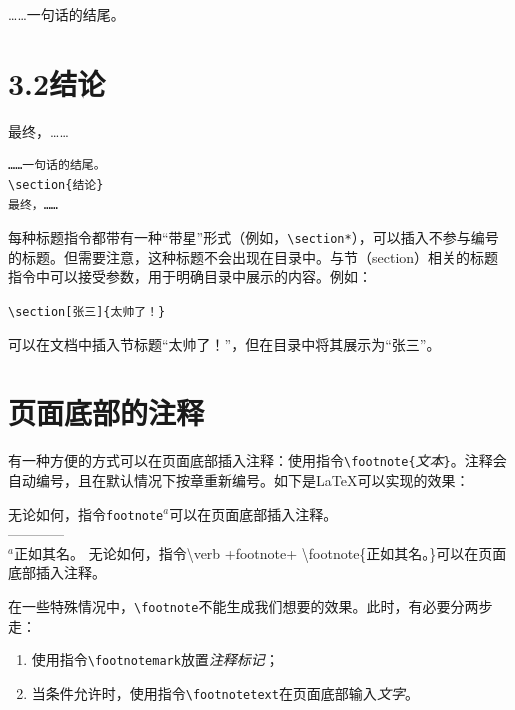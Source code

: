 \begin{codelist}[2.17]{
  ……一句话的结尾。
  \section*{3.2\quad 结论}
  最终，……
}\begin{verbatim}
……一句话的结尾。
\section{结论}
最终，……
\end{verbatim}
\end{codelist}

每种标题指令都带有一种“带星”形式（例如，\verb|\section*|），可以插入不参与编号的标题。但需要注意，这种标题不会出现在目录中。与节（section）相关的标题指令中可以接受参数，用于明确目录中展示的内容。例如：

\begin{dmd}
\verb+\section[张三]{太帅了！}+
\end{dmd}

可以在文档中插入节标题“太帅了！”，但在目录中将其展示为“张三”。

\section{页面底部的注释}

有一种方便的方式可以在页面底部插入注释：使用指令\verb|\footnote{|\textsl{\<文本\>}\verb|}|。注释会自动编号，且在默认情况下按章重新编号。如下是\LaTeX 可以实现的效果：

\begin{codelist}[2.18]{
  无论如何，指令\texttt{footnote}$^a$可以在页面底部插入注释。\\
  ————\\%
  {\footnotesize $^a$正如其名。}
}\ttfamily
无论如何，指令\backslash verb +footnote+
\backslash footnote\{正如其名。\}可以在页面
底部插入注释。\rmfamily
\end{codelist}

在一些特殊情况中，\verb|\footnote|不能生成我们想要的效果。此时，有必要分两步走：

\begin{enumerate}
  \item 使用指令\verb|\footnotemark|放置\emph{注释标记}；
  \item 当条件允许时，使用指令\verb|\footnotetext|在页面底部输入\emph{文字}。
\end{enumerate}


